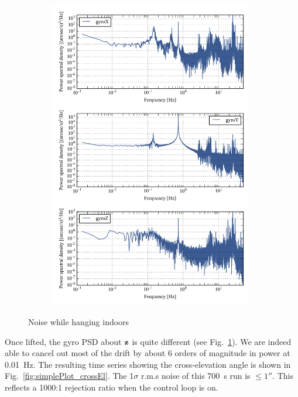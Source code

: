 \begin{landscape}
\begin{figure}[!h]
\begin{subfigure}[b]{0.7\textwidth}
	\end{subfigure}
\begin{subfigure}[b]{0.7\textwidth}
		\centering
	\includegraphics[width=0.98\textwidth]{Figures/multiPSD100.png}
	\caption{}
	\label{fig:multiPSD100_controlled}
	\end{subfigure}
\caption[Noise while hanging]{Noise while hanging indoors}
\label{fig:multiPSD}
\end{figure}
\end{landscape}



Once lifted, the gyro PSD about $\textrm{\textbf{z}}$ is quite different (see Fig.~\ref{fig:multiPSD100_controlled}). We are indeed able to cancel out most of the drift by about 6 orders of magnitude in power at \SI{0.01}{\hertz}. The resulting time series showing the cross-elevation angle is shown in Fig.~\ref{fig:simplePlot_crossEl}. The 1$\sigma$ r.m.s noise of this \SI{700}{\second} run is $\le\ang{;;1}$. This reflects a 1000:1 rejection ratio when the control loop is on.

